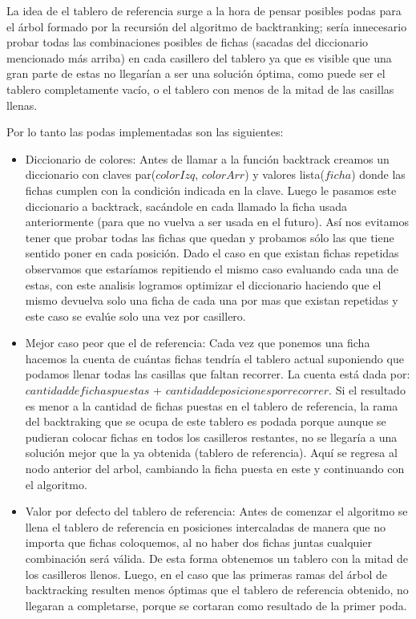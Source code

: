 La idea de el tablero de referencia surge a la hora de pensar posibles podas para el \'arbol formado por la recursi\'on del algoritmo de backtranking; ser\'ia innecesario probar todas las combinaciones posibles de fichas (sacadas del diccionario mencionado m\'as arriba) en cada casillero del tablero ya que es  visible que una gran parte de estas no llegar\'ian a ser una soluci\'on \'optima, como puede ser el tablero completamente vac\'io, o el tablero con menos de la mitad de las casillas llenas.

Por lo tanto las podas implementadas son las siguientes:

\begin{itemize}

\item Diccionario de colores: Antes de llamar a la funci\'on backtrack creamos un diccionario con claves par($colorIzq$, $colorArr$) y valores lista($ficha$) donde las fichas cumplen con la condici\'on indicada en la clave. Luego le pasamos este diccionario a backtrack, sac\'andole en cada llamado la ficha usada anteriormente (para que no vuelva a ser usada en el futuro). As\'i nos evitamos tener que probar todas las fichas que quedan y probamos s\'olo las que tiene sentido poner en cada posici\'on. Dado el caso en que existan fichas repetidas observamos que estar\'iamos repitiendo el mismo caso evaluando cada una de estas, con este analisis logramos optimizar el diccionario haciendo que el mismo devuelva solo una ficha de cada una por mas que existan repetidas y este caso se eval\'ue solo una vez por casillero. 

\item Mejor caso peor que el de referencia: Cada vez que ponemos una ficha hacemos la cuenta de cu\'antas fichas tendr\'ia el tablero actual suponiendo que podamos llenar todas las casillas que faltan recorrer. La cuenta est\'a dada por: $cantidad de fichas puestas$ + $cantidad de posiciones por recorrer$. Si el resultado es menor a la cantidad de fichas puestas en el tablero de referencia, la rama del backtraking que se ocupa de este tablero es podada porque aunque se pudieran colocar fichas en todos los casilleros restantes, no se llegar\'ia a una soluci\'on mejor que la ya obtenida (tablero de referencia). Aqu\'i se regresa al nodo anterior del arbol, cambiando la ficha puesta en este y continuando con el algoritmo.

\item Valor por defecto del tablero de referencia: Antes de comenzar el algoritmo se llena el tablero de referencia en posiciones intercaladas de manera que no importa que fichas coloquemos, al no haber dos fichas juntas cualquier combinaci\'on ser\'a v\'alida. De esta forma obtenemos un tablero con la mitad de los casilleros llenos. Luego, en el caso que las primeras ramas del \'arbol de backtracking resulten menos \'optimas que el tablero de referencia obtenido, no llegaran a completarse, porque se cortaran como resultado de la primer poda.


\end{itemize}
